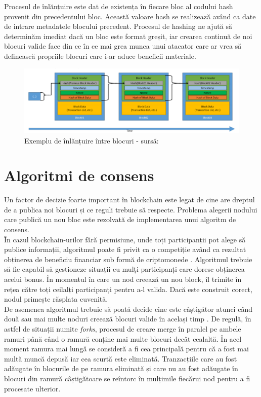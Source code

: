 Procesul de înlănțuire este dat de existența în fiecare bloc al codului hash provenit din precedentului bloc. Această valoare hash se realizează având ca date de intrare metadatele blocului precedent. Procesul de hashing ne ajută să determinăm imediat dacă un bloc este format greșit, iar crearea continuă de noi blocuri valide face din ce în ce mai grea munca unui atacator care ar vrea să definească propriile blocuri care i-ar aduce beneficii materiale.\\

\begin{figure}[H] 
\centering
\includegraphics[scale=0.55]{Images/BC_Chaining.png}
\caption{Exemplu de înlănțuire între blocuri - sursă: \cite{Blockchain_Overview_NIST}}
\end{figure}

\section{Algoritmi de consens}

Un factor de decizie foarte important în blockchain este legat de cine are dreptul de a publica noi blocuri și ce reguli trebuie să respecte. Problema alegerii nodului care publică un nou bloc este rezolvată de implementarea unui algoritm de consens.\\

În cazul blockchain-urilor fără permisiune, unde toți participanții pot alege să publice informații, algoritmul poate fi privit ca o competiție având ca rezultat obținerea de beneficiu financiar sub formă de criptomonede \cite{Blockchain_Overview_NIST}. Algoritmul trebuie să fie capabil să gestioneze situații cu mulți participanți care doresc obținerea acelui bonus. În momentul în care un nod creează un nou block, îl trimite în rețea către toți ceilalți participanți pentru a-l valida. Dacă este construit corect, nodul primește răsplata cuvenită.\\

De asemenea algoritmul trebuie să poată decide cine este câștigător atunci când două sau mai multe noduri creează blocuri valide în același timp \cite{Blockchain_Overview_IEEE}. De regulă, în astfel de situații numite \textit{forks}, procesul de creare merge în paralel pe ambele ramuri până când o ramură conține mai multe blocuri decât cealaltă. În acel moment ramura mai lungă se consideră a fi cea principală pentru că a fost mai multă muncă depusă iar cea scurtă este eliminată. Tranzacțiile care au fost adăugate în blocurile de pe ramura eliminată și care nu au fost adăugate în blocuri din ramură câștigătoare se reîntorc în mulțimile fiecărui nod pentru a fi procesate ulterior.\\

